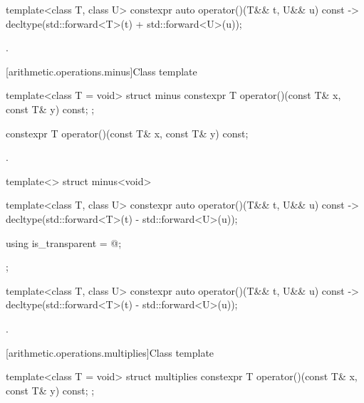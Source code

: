 %
\begin{itemdecl}
template<class T, class U> constexpr auto operator()(T&& t, U&& u) const
    -> decltype(std::forward<T>(t) + std::forward<U>(u));
\end{itemdecl}

\begin{itemdescr}
\pnum\returns {}.
\end{itemdescr}

[arithmetic.operations.minus]{Class template }

%
\begin{itemdecl}
template<class T = void> struct minus {
  constexpr T operator()(const T& x, const T& y) const;
};
\end{itemdecl}

%
\begin{itemdecl}
constexpr T operator()(const T& x, const T& y) const;
\end{itemdecl}

\begin{itemdescr}
\pnum\returns {}.
\end{itemdescr}

%
\begin{itemdecl}
template<> struct minus<void> {
  template<class T, class U> constexpr auto operator()(T&& t, U&& u) const
    -> decltype(std::forward<T>(t) - std::forward<U>(u));

  using is_transparent = @\unspec@;
};
\end{itemdecl}

%
\begin{itemdecl}
template<class T, class U> constexpr auto operator()(T&& t, U&& u) const
    -> decltype(std::forward<T>(t) - std::forward<U>(u));
\end{itemdecl}

\begin{itemdescr}
\pnum\returns {}.
\end{itemdescr}

[arithmetic.operations.multiplies]{Class template }

%
\begin{itemdecl}
template<class T = void> struct multiplies {
  constexpr T operator()(const T& x, const T& y) const;
};
\end{itemdecl}

